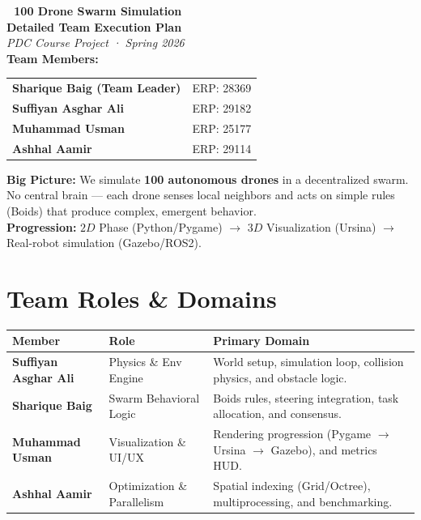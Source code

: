 \documentclass[11pt,a4paper]{article}
\begin{document}
\begin{center}
    {\Huge \bfseries \color{primary} 🚁 100 Drone Swarm Simulation} \\
    \vspace{0.5cm}
    {\Large \bfseries Detailed Team Execution Plan} \\
    \vspace{0.2cm}
    {\large \textit{PDC Course Project · Spring 2026}} \\
    \vspace{0.8cm}
    \textbf{Team Members:} \\
    \begin{tabular}{l l}
        \textbf{Sharique Baig (Team Leader)} & ERP: 28369 \\
        \textbf{Suffiyan Asghar Ali} & ERP: 29182 \\
        \textbf{Muhammad Usman} & ERP: 25177 \\
        \textbf{Ashhal Aamir} & ERP: 29114 \\
    \end{tabular}
\end{center}

\vspace{0.5cm}

\begin{mdframed}[backgroundcolor=lightgray, linecolor=primary, linewidth=1pt]
\textbf{Big Picture:} We simulate \textbf{100 autonomous drones} in a decentralized swarm. No central brain — each drone senses local neighbors and acts on simple rules (Boids) that produce complex, emergent behavior. \\
\textbf{Progression:} $2D$ Phase (Python/Pygame) $\rightarrow$ $3D$ Visualization (Ursina) $\rightarrow$ Real-robot simulation (Gazebo/ROS2).
\end{mdframed}

\section{Team Roles \& Domains}
\begin{center}
\begin{tabularx}{\textwidth}{l l X}
\toprule
\textbf{Member} & \textbf{Role} & \textbf{Primary Domain} \\
\midrule
\textbf{Suffiyan Asghar Ali} & Physics \& Env Engine & World setup, simulation loop, collision physics, and obstacle logic. \\
\textbf{Sharique Baig} & Swarm Behavioral Logic & Boids rules, steering integration, task allocation, and consensus. \\
\textbf{Muhammad Usman} & Visualization \& UI/UX & Rendering progression (Pygame $\rightarrow$ Ursina $\rightarrow$ Gazebo), and metrics HUD. \\
\textbf{Ashhal Aamir} & Optimization \& Parallelism & Spatial indexing (Grid/Octree), multiprocessing, and benchmarking. \\
\bottomrule
\end{tabularx}
\end{center}
\end{document}
